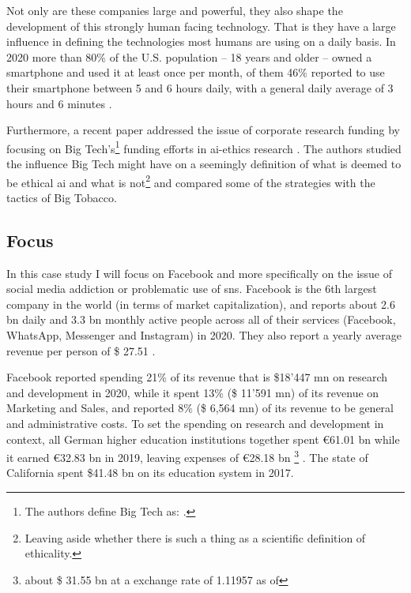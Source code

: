 Not only are these companies large and powerful, they also shape the development of this strongly human facing technology. That is they have a large influence in defining the technologies most humans are using on a daily basis. 
In 2020 more than 80\% of the U.S. population -- 18 years and older -- owned a smartphone and used it at least once per month, of them 46\% reported to use their smartphone between 5 and 6 hours daily, with a general daily average of 3 hours and 6 minutes \citep{noauthor_us_2021, noauthor_smartphone_2021, noauthor_time_2020}. 

Furthermore, a recent paper addressed the issue of corporate research funding by focusing on Big Tech's\footnote{The authors define Big Tech as:  \citep{abdalla_grey_2021}.} funding efforts in \gls{ai}-ethics research \citep{abdalla_grey_2021}.
The authors studied the influence Big Tech might have on a seemingly  definition of what is deemed to be ethical \gls{ai} and what is not\footnote{Leaving aside whether there is such a thing as a scientific definition of ethicality.} and compared some of the strategies with the tactics of Big Tobacco.

\subsection{Focus}
In this case study I will focus on Facebook and more specifically on the issue of social media addiction or problematic use of \gls{sns}.
Facebook is the 6th largest company in the world (in terms of market capitalization), and reports about 2.6 \gls{bn} daily and 3.3 \gls{bn} monthly active people across all of their services (Facebook, WhatsApp, Messenger and Instagram) in 2020.
They also report a yearly average revenue per person of \$ 27.51 .

Facebook reported spending 21\% of its revenue that is \$18'447 \gls{mn} on research and development in 2020, while it spent 13\% (\$ 11'591 \gls{mn}) of its revenue on Marketing and Sales, and reported 8\% (\$ 6,564 \gls{mn}) of its revenue to be  general and administrative costs. 
To set the spending on research and development in context, all German higher education institutions together spent €61.01 \gls{bn} while it earned €32.83 \gls{bn} in 2019, leaving expenses of €28.18 \gls{bn} \footnote{about \$ 31.55 \gls{bn} at a exchange rate of 1.11957 as of  } . The state of California spent \$41.48 \gls{bn} on its education system in 2017.  

